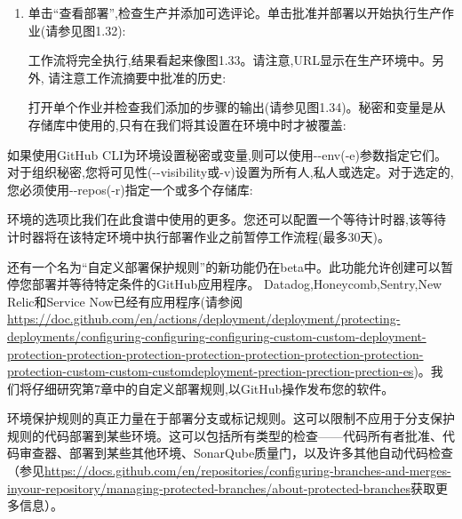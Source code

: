 \begin{enumerate}
\item 
单击“查看部署”,检查生产并添加可选评论。单击批准并部署以开始执行生产作业(请参见图1.32):


工作流将完全执行,结果看起来像图1.33。请注意,URL显示在生产环境中。另外, 请注意工作流摘要中批准的历史:


打开单个作业并检查我们添加的步骤的输出(请参见图1.34)。秘密和变量是从存储库中使用的,只有在我们将其设置在环境中时才被覆盖:


\end{enumerate}


如果使用GitHub CLI为环境设置秘密或变量,则可以使用-{}-env(-e)参数指定它们。对于组织秘密,您将可见性(-{}-visibility或-v)设置为所有人,私人或选定。对于选定的,您必须使用-{}-repos(-r)指定一个或多个存储库:


环境的选项比我们在此食谱中使用的更多。您还可以配置一个等待计时器,该等待计时器将在该特定环境中执行部署作业之前暂停工作流程(最多30天)。

还有一个名为“自定义部署保护规则”的新功能仍在beta中。此功能允许创建可以暂停您部署并等待特定条件的GitHub应用程序。 Datadog,Honeycomb,Sentry,New Relic和Service Now已经有应用程序(请参阅\url{https://doc.github.com/en/actions/deployment/deployment/protecting-deployments/configuring-configuring-configuring-custom-custom-deployment-protection-protection-protection-protection-protection-protection-protection-protection-custom-custom-customdeployment-prection-prection-prection-es})。我们将仔细研究第7章中的自定义部署规则,以GitHub操作发布您的软件。

环境保护规则的真正力量在于部署分支或标记规则。这可以限制不应用于分支保护规则的代码部署到某些环境。这可以包括所有类型的检查——代码所有者批准、代码审查器、部署到某些其他环境、SonarQube质量门，以及许多其他自动代码检查（参见\url{https://docs.github.com/en/repositories/configuring-branches-and-merges-inyour-repository/managing-protected-branches/about-protected-branches}获取更多信息）。

























